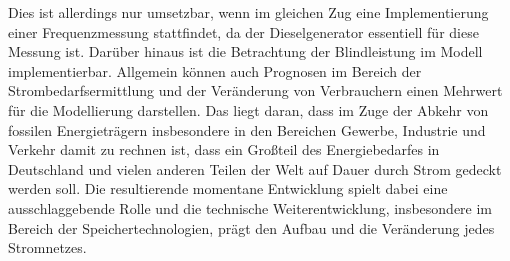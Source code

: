 Dies ist allerdings nur umsetzbar, wenn im gleichen Zug eine Implementierung einer Frequenzmessung stattfindet, da der Dieselgenerator essentiell für diese Messung ist.
Darüber hinaus ist die Betrachtung der Blindleistung im Modell implementierbar.
Allgemein können auch Prognosen im Bereich der Strombedarfsermittlung und der Veränderung von Verbrauchern einen Mehrwert für die Modellierung darstellen.
Das liegt daran, dass im Zuge der Abkehr von fossilen Energieträgern insbesondere in den Bereichen Gewerbe, Industrie und Verkehr damit zu rechnen ist, dass ein Großteil des Energiebedarfes in Deutschland und vielen anderen Teilen der Welt auf Dauer durch Strom gedeckt werden soll.
Die resultierende momentane Entwicklung spielt dabei eine ausschlaggebende Rolle und die technische Weiterentwicklung, insbesondere im Bereich der Speichertechnologien, prägt den Aufbau und die Veränderung jedes Stromnetzes.


